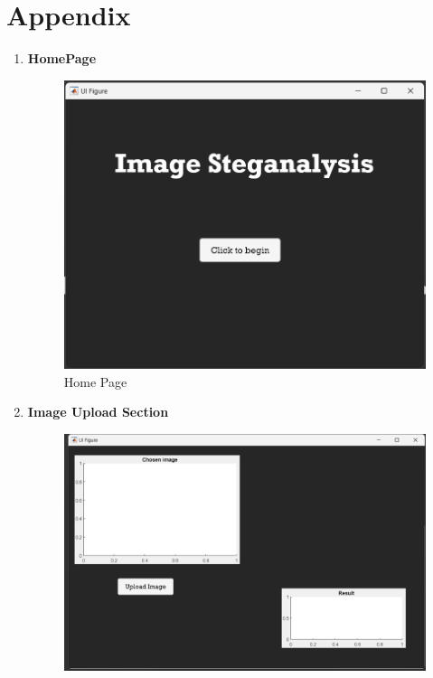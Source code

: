 \chapter*{Appendix}
\renewcommand{\thefigure}{A-\arabic{figure}}

\begin{enumerate}
\item \Large \textbf{HomePage} 
\begin{figure}[H]
    \centering
    \includegraphics[width=140mm]{./img/HomePage.png}
    \caption{Home Page}
\end{figure}
\clearpage
\item \Large \textbf{Image Upload Section} 
\begin{figure}[H]
    \centering
    \includegraphics[width=140mm]{./img/choose.png}

\end{figure}
\end{enumerate}
